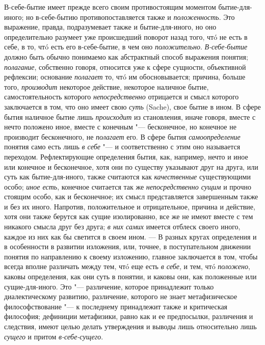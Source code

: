 В-себе-бытие имеет прежде всего своим противостоящим моментом
бытие-для-иного; но в-себе-бытию противопоставляется также и
{\em положенность}. Это выражение, правда,
подразумевает также и бытие-для-иного, но оно определительно разумеет уже
происшедший поворот назад того, чтó не есть в себе, в то, чтó есть его
в-себе-бытие, в чем оно {\em положительно}.
{\em В-себе-бытие} должно быть обычно понимаемо как
абстрактный способ выражения понятия; {\em полагание},
собственно говоря, относится уже к сфере сущности, объективной рефлексии;
основание {\em полагает} то, чтó им обосновывается;
причина, больше того, {\em производит} некоторое
действие, некоторое наличное бытие, самостоятельность которого
{\em непосредственно} отрицается и смысл которого
заключается в том, что оно имеет свою {\em суть}
(Sache), свое бытие в ином. В сфере бытия наличное бытие лишь
{\em происходит} из становления, иначе говоря, вместе с нечто
положено иное, вместе с конечным "--- бесконечное, но конечное не
производит бесконечного, не {\em полагает} его. В сфере
бытия {\em самоопределение} понятия само есть лишь
{\em в себе} "--- и соответственно с этим оно называется
переходом. Рефлектирующие определения бытия, как, например, нечто и иное
или конечное и бесконечное, хотя они по существу указывают друг на друга,
или суть как бытие-для-иного, также считаются как
{\em качественные} существующими особо;
{\em иное есть}, конечное считается так же
{\em непосредственно сущим} и прочно стоящим особо, как
и бесконечное; их смысл представляется завершенным также и без их иного.
Напротив, положительное и отрицательное, причина и действие, хотя они также
берутся как сущие изолированно, все же не имеют вместе с тем никакого
смысла друг без друга; {\em в них самих} имеется
отблеск своего иного, каждое из них как бы светится в своем ином. --- В
разных кругах определения и в особенности в развитии
изложения, или, точнее, в поступательном движении понятия по направлению к
своему изложению, главное заключается в том, чтобы всегда вполне различать
между тем, чтó еще есть {\em в себе}, и тем, чтó
{\em положено}, каковы определения, как они суть в
понятии, и каковы они, как положенные или сущие-для-иного. Это
"--- различение, которое принадлежит только диалектическому развитию,
различение, которого не знает метафизическое философствование "--- к
последнему принадлежит также и критическая философия; дефиниции метафизики,
равно как и ее предпосылки, различения и следствия, имеют целью делать
утверждения и выводы лишь относительно лишь {\em сущего} и
притом {\em в-себе-сущего}.

